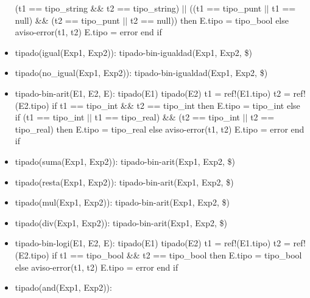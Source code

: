 \documentclass[11pt]{article}
\begin{document}
\begin{itemize}
                    (t1 == tipo\_string \&\&  t2 == tipo\_string) $\vert \vert$ 
                    ((t1 == tipo\_punt $\vert \vert$ t1 == null) \&\&  (t2 == tipo\_punt $\vert \vert$ t2 == null)) then
                    \subsubitem E.tipo = tipo\_bool
                \subitem else
                    \subsubitem aviso-error(t1, t2)
                    \subsubitem E.tipo = error
                \subitem end if
            \item tipado(igual(Exp1, Exp2)): 
                \subitem tipado-bin-igualdad(Exp1, Exp2, \$)
            \item tipado(no\_igual(Exp1, Exp2)): 
                \subitem tipado-bin-igualdad(Exp1, Exp2, \$)
            \item tipado-bin-arit(E1, E2, E): 
                \subitem tipado(E1) 
                \subitem tipado(E2) 
                \subitem t1 = ref!(E1.tipo) 
                \subitem t2 = ref!(E2.tipo) 
                \subitem if t1 == tipo\_int \&\&  t2 == tipo\_int then
                    \subsubitem E.tipo = tipo\_int
                \subitem else if (t1 == tipo\_int $\vert \vert$ t1 == tipo\_real) \&\&  (t2 == tipo\_int $\vert \vert$ t2 == tipo\_real) then
                    \subsubitem E.tipo = tipo\_real
                \subitem else 
                    \subsubitem aviso-error(t1, t2)
                    \subsubitem E.tipo = error
                \subitem end if
            \item tipado(suma(Exp1, Exp2)): 
                \subitem tipado-bin-arit(Exp1, Exp2, \$)
            \item tipado(resta(Exp1, Exp2)): 
                \subitem tipado-bin-arit(Exp1, Exp2, \$)
            \item tipado(mul(Exp1, Exp2)): 
                \subitem tipado-bin-arit(Exp1, Exp2, \$)
            \item tipado(div(Exp1, Exp2)): 
                \subitem tipado-bin-arit(Exp1, Exp2, \$)
            \item tipado-bin-logi(E1, E2, E): 
                \subitem tipado(E1) 
                \subitem tipado(E2) 
                \subitem t1 = ref!(E1.tipo) 
                \subitem t2 = ref!(E2.tipo) 
                \subitem if t1 == tipo\_bool \&\&  t2 == tipo\_bool then
                    \subsubitem E.tipo = tipo\_bool
                \subitem else
                    \subsubitem aviso-error(t1, t2)
                    \subsubitem E.tipo = error
                \subitem end if
            \item tipado(and(Exp1, Exp2)): 

\end{itemize}
\end{document}
